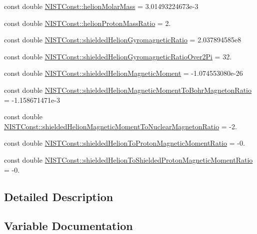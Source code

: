 \begin{DoxyCompactItemize}
const double \mbox{\hyperlink{group___n_i_s_t_const-_helion_gac7da5201f92f47f4ca2310ae1c9f4fb6}{N\+I\+S\+T\+Const\+::helion\+Molar\+Mass}} = 3.\+01493224673e-\/3
\item 
const double \mbox{\hyperlink{group___n_i_s_t_const-_helion_ga6ddd4a293fd1d7adac9a20dc6ee2a7d6}{N\+I\+S\+T\+Const\+::helion\+Proton\+Mass\+Ratio}} = 2.
\item 
const double \mbox{\hyperlink{group___n_i_s_t_const-_helion_gaf3b7dabd6de7a263aba710256e793c8e}{N\+I\+S\+T\+Const\+::shielded\+Helion\+Gyromagnetic\+Ratio}} = 2.\+037894585e8
\item 
const double \mbox{\hyperlink{group___n_i_s_t_const-_helion_gaed43f2ab9c5e89c6dda577a3b5fc265c}{N\+I\+S\+T\+Const\+::shielded\+Helion\+Gyromagnetic\+Ratio\+Over2\+Pi}} = 32.
\item 
const double \mbox{\hyperlink{group___n_i_s_t_const-_helion_ga1b0f92c14390afe726af4005e21c2ae8}{N\+I\+S\+T\+Const\+::shielded\+Helion\+Magnetic\+Moment}} = -\/1.\+074553080e-\/26
\item 
const double \mbox{\hyperlink{group___n_i_s_t_const-_helion_gac48304d45406c207fbadeca604d5c71a}{N\+I\+S\+T\+Const\+::shielded\+Helion\+Magnetic\+Moment\+To\+Bohr\+Magneton\+Ratio}} = -\/1.\+158671471e-\/3
\item 
const double \mbox{\hyperlink{group___n_i_s_t_const-_helion_gae3bf1eccb33e00a6da688959fd99bbb3}{N\+I\+S\+T\+Const\+::shielded\+Helion\+Magnetic\+Moment\+To\+Nuclear\+Magneton\+Ratio}} = -\/2.
\item 
const double \mbox{\hyperlink{group___n_i_s_t_const-_helion_ga9aa0ad55bc28f6402fcd872f9435547e}{N\+I\+S\+T\+Const\+::shielded\+Helion\+To\+Proton\+Magnetic\+Moment\+Ratio}} = -\/0.
\item 
const double \mbox{\hyperlink{group___n_i_s_t_const-_helion_ga3b8301672e9de426ef6bf13276b42acc}{N\+I\+S\+T\+Const\+::shielded\+Helion\+To\+Shielded\+Proton\+Magnetic\+Moment\+Ratio}} = -\/0.
\end{DoxyCompactItemize}


\subsection{Detailed Description}


\subsection{Variable Documentation}
\mbox{\label{group___n_i_s_t_const-_helion_ga5c779784a4f223f0936cb067e2674474}} 
